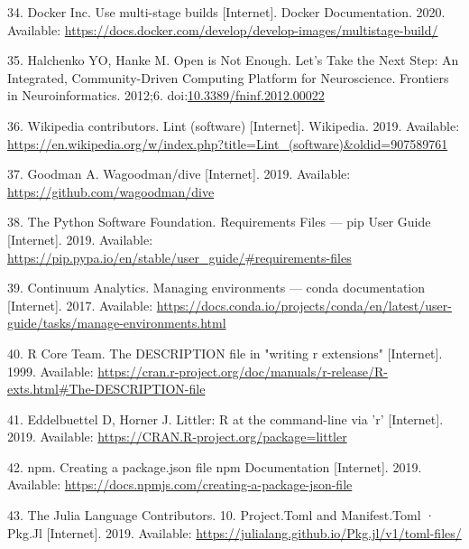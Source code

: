 \documentclass[10pt,letterpaper]{article}
\begin{document}
\leavevmode\hypertarget{ref-docker_multi-stage_2020}{}%
34. Docker Inc. Use multi-stage builds {[}Internet{]}. Docker
Documentation. 2020. Available:
\url{https://docs.docker.com/develop/develop-images/multistage-build/}

\leavevmode\hypertarget{ref-halchenko_open_2012}{}%
35. Halchenko YO, Hanke M. Open is Not Enough. Let's Take the Next Step:
An Integrated, Community-Driven Computing Platform for Neuroscience.
Frontiers in Neuroinformatics. 2012;6.
doi:\href{https://doi.org/10.3389/fninf.2012.00022}{10.3389/fninf.2012.00022}

\leavevmode\hypertarget{ref-wikipedia_contributors_lint_2019}{}%
36. Wikipedia contributors. Lint (software) {[}Internet{]}. Wikipedia.
2019. Available:
\url{https://en.wikipedia.org/w/index.php?title=Lint_(software)\&oldid=907589761}

\leavevmode\hypertarget{ref-goodman_dive_2019}{}%
37. Goodman A. Wagoodman/dive {[}Internet{]}. 2019. Available:
\url{https://github.com/wagoodman/dive}

\leavevmode\hypertarget{ref-the_python_software_foundation_requirements_2019}{}%
38. The Python Software Foundation. Requirements Files --- pip User
Guide {[}Internet{]}. 2019. Available:
\url{https://pip.pypa.io/en/stable/user_guide/\#requirements-files}

\leavevmode\hypertarget{ref-continuum_analytics_managing_2017}{}%
39. Continuum Analytics. Managing environments --- conda documentation
{[}Internet{]}. 2017. Available:
\url{https://docs.conda.io/projects/conda/en/latest/user-guide/tasks/manage-environments.html}

\leavevmode\hypertarget{ref-r_core_team_description_1999}{}%
40. R Core Team. The DESCRIPTION file in "writing r extensions"
{[}Internet{]}. 1999. Available:
\url{https://cran.r-project.org/doc/manuals/r-release/R-exts.html\#The-DESCRIPTION-file}

\leavevmode\hypertarget{ref-eddelbuettel_littler_2019}{}%
41. Eddelbuettel D, Horner J. Littler: R at the command-line via 'r'
{[}Internet{]}. 2019. Available:
\url{https://CRAN.R-project.org/package=littler}

\leavevmode\hypertarget{ref-npm_creating_2019}{}%
42. npm. Creating a package.json file npm Documentation {[}Internet{]}.
2019. Available:
\url{https://docs.npmjs.com/creating-a-package-json-file}

\leavevmode\hypertarget{ref-julia_tomls_2019}{}%
43. The Julia Language Contributors. 10. Project.Toml and Manifest.Toml
· Pkg.Jl {[}Internet{]}. 2019. Available:
\url{https://julialang.github.io/Pkg.jl/v1/toml-files/}
\end{document}
